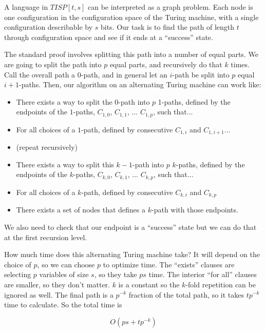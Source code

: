 \documentclass{article}
\newenvironment{problem}[2][Problem]{\begin{trivlist}
\item[\hskip \labelsep {\bfseries #1}\hskip \labelsep {\bfseries #2.}]}{\end{trivlist}}
\begin{document}
\begin{problem}{3}
  A language in $TISP[t, s]$ can be interpreted as a graph
  problem. Each node is one configuration in the configuration space
  of the Turing machine, with a single configuration describable by
  $s$ bits. Our task is to find the path of length $t$ through
  configuration space and see if it ends at a ``success'' state.

  The standard proof involves splitting this path into a number of
  equal parts. We are going to split the path into $p$ equal parts, and
  recursively do that $k$ times. Call the overall path a $0$-path, and
  in general let an $i$-path be split into $p$ equal
  $i+1$-paths. Then, our algorithm on an alternating Turing machine
  can work like:

  \begin{itemize}
    \item There exists a way to split the $0$-path into $p$ 1-paths,
      defined by the endpoints of the $1$-paths, $C_{1,0}$, $C_{1,1}$,
      ... $C_{1,p}$, such that...
    \item For all choices of a $1$-path, defined by consecutive $C_{1,i}$
      and $C_{1,i+1}$...
    \item (repeat recursively)
    \item There exists a way to split this $k-1$-path into $p$
      $k$-paths, defined by the endpoints of the $k$-paths, $C_{k,0}$,
      $C_{k,1}$, ... $C_{k,p}$, such that...
    \item For all choices of a $k$-path, defined by consecutive
      $C_{k,i}$ and $C_{k,p}$
    \item There exists a set of nodes that defines a $k$-path with
      those endpoints.
  \end{itemize}

  We also need to check that our endpoint is a ``success'' state but
  we can do that at the first recursion level.

  How much time does this alternating Turing machine take? It will
  depend on the choice of $p$, so we can choose $p$ to optimize
  time. The ``exists'' clauses are selecting $p$ variables of size
  $s$, so they take $ps$ time. The interior ``for all'' clauses are
  smaller, so they don't matter. $k$ is a constant so the $k$-fold
  repetition can be ignored as well. The final path is a $p^{-k}$ fraction
  of the total path, so it takes $tp^{-k}$ time to calculate. So the
  total time is

  \begin{equation}
    O(ps + tp^{-k})
  \end{equation}


\end{problem}
\end{document}
